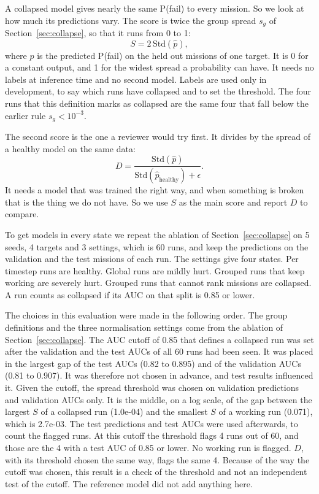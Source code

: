 \documentclass[preprint,12pt,authoryear,doubleblind]{elsarticle}
\begin{document}
A collapsed model gives nearly the same P(fail) to every mission. So we look at how much its predictions vary. The score is twice the group spread $s_g$ of Section~\ref{sec:collapse}, so that it runs from 0 to 1:
\begin{equation}
S = 2\,\mathrm{Std}(\hat{p}),
\end{equation}
where $\hat{p}$ is the predicted P(fail) on the held out missions of one target. It is 0 for a constant output, and 1 for the widest spread a probability can have. It needs no labels at inference time and no second model. Labels are used only in development, to say which runs have collapsed and to set the threshold. The four runs that this definition marks as collapsed are the same four that fall below the earlier rule $s_g<10^{-3}$.

The second score is the one a reviewer would try first. It divides by the spread of a healthy model on the same data:
\begin{equation}
D = \frac{\mathrm{Std}(\hat{p})}{\mathrm{Std}(\hat{p}_{\mathrm{healthy}}) + \epsilon}.
\end{equation}
It needs a model that was trained the right way, and when something is broken that is the thing we do not have. So we use $S$ as the main score and report $D$ to compare.

To get models in every state we repeat the ablation of Section~\ref{sec:collapse} on 5 seeds, 4 targets and 3 settings, which is 60 runs, and keep the predictions on the validation and the test missions of each run. The settings give four states. Per timestep runs are healthy. Global runs are mildly hurt. Grouped runs that keep working are severely hurt. Grouped runs that cannot rank missions are collapsed. A run counts as collapsed if its AUC on that split is 0.85 or lower.

The choices in this evaluation were made in the following order. The group definitions and the three normalisation settings come from the ablation of Section~\ref{sec:collapse}. The AUC cutoff of 0.85 that defines a collapsed run was set after the validation and the test AUCs of all 60 runs had been seen. It was placed in the largest gap of the test AUCs (0.82 to 0.895) and of the validation AUCs (0.81 to 0.907). It was therefore not chosen in advance, and test results influenced it. Given the cutoff, the spread threshold was chosen on validation predictions and validation AUCs only. It is the middle, on a log scale, of the gap between the largest $S$ of a collapsed run (1.0e-04) and the smallest $S$ of a working run (0.071), which is 2.7e-03. The test predictions and test AUCs were used afterwards, to count the flagged runs. At this cutoff the threshold flags 4 runs out of 60, and those are the 4 with a test AUC of 0.85 or lower. No working run is flagged. $D$, with its threshold chosen the same way, flags the same 4. Because of the way the cutoff was chosen, this result is a check of the threshold and not an independent test of the cutoff. The reference model did not add anything here.
\end{document}
